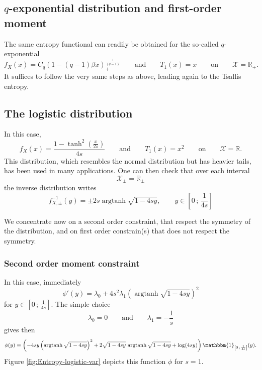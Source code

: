\documentclass[english]{elsarticle}
\theoremstyle{definition}
\theoremstyle{plain}
\theoremstyle{plain}
\def\Rset{\mathbb{R}}
\def\X{\mathcal{X}}
\def\un{\mathbbm{1}}
\def\argtanh{\operatorname{argtanh}}
\begin{document}



\subsection{$q$-exponential distribution and first-order moment}

\label{subsec:qExponentialFirstOrder}

The same entropy functional can readily be obtained for the so-called
$q$-exponential 
\[
f_{X}(x)=C_{q}\left(1-(q-1)\beta x\right)_{+}^{\frac{1}{(q-1)}}\qquad\mbox{and}\qquad T_{1}(x)=x\qquad\mbox{on}\qquad\X=\Rset_{+}.
\]
It suffices to follow the very same steps as above, leading again
to the Tsallis entropy. %





\subsection{The logistic distribution}

\label{subsec:Logistic}

In this case, 
\[
f_{X}(x)=\frac{1-\tanh^{2}\!\left(\frac{x}{2s}\right)}{4s}\qquad\mbox{and}\qquad T_{1}(x)=x^{2}\qquad\mbox{on}\qquad\X=\Rset.
\]
This distribution, which resembles the normal distribution but has
heavier tails, has been used in many applications. One can then check
that over each interval 
\[
\X_{\pm}=\Rset_{\pm}
\]
the inverse distribution writes 
\[
f_{X,\pm}^{-1}(y)=\pm2s\argtanh\sqrt{1-4sy},\qquad y\in\left[0\,;\,\frac{1}{4s}\right]
\]


We concentrate now on a second order constraint, that respect the
symmetry of the distribution, and on first order constrain(s) that
does not respect the symmetry.




\subsubsection{Second order moment constraint}

In this case, immediately 
\[
\phi'(y)=\lambda_{0}+4s^{2}\lambda_{1}\left(\argtanh\sqrt{1-4sy}\right)^{2}
\]
for $y\in\left[0\,;\,\frac{1}{4s}\right]$. The simple choice 
\[
\lambda_{0}=0\qquad\mbox{and}\qquad\lambda_{1}=-\frac{1}{s}
\]
gives then 
\[
\phi(y)=\left(-4sy\left(\argtanh\sqrt{1-4sy}\right)^{2}+2\sqrt{1-4sy}\,\argtanh\sqrt{1-4sy}+\log(4sy)\right)\un_{\left[0\,;\,\frac{1}{4s}\right]}(y).
\]
Figure \ref{fig:Entropy-logistic-var} depicts this function $\phi$
for $s=1$.
\end{document}
